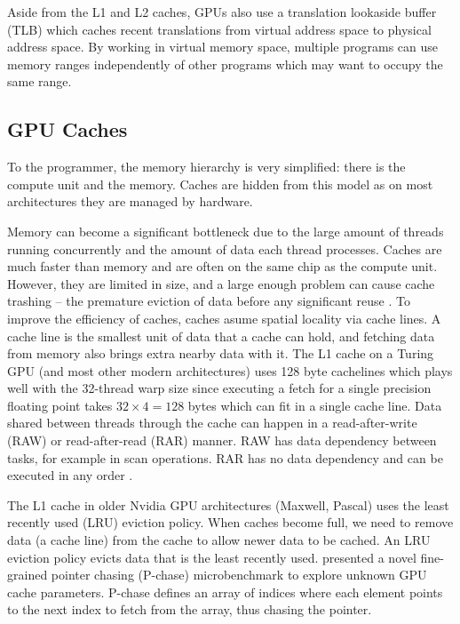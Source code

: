 Aside from the L1 and L2 caches, GPUs also use a translation lookaside buffer (TLB) which caches recent translations from virtual address space to physical address space.
By working in virtual memory space, multiple programs can use memory ranges independently of other programs which may want to occupy the same range.

\subsection{GPU Caches}
\label{sec:cache_gpu}
To the programmer, the memory hierarchy is very simplified: there is the compute unit and the memory.
Caches are hidden from this model as on most architectures they are managed by hardware.

Memory can become a significant bottleneck due to the large amount of threads running concurrently and the amount of data each thread processes.
Caches are much faster than memory and are often on the same chip as the compute unit.
However, they are limited in size, and a large enough problem can cause cache trashing -- the premature eviction of data before any significant reuse \cite{dai2016model}.
To improve the efficiency of caches, caches asume spatial locality via cache lines.
A cache line is the smallest unit of data that a cache can hold, and fetching data from memory also brings extra nearby data with it.
The L1 cache on a Turing GPU (and most other modern architectures) uses 128 byte cachelines which plays well with the 32-thread warp size since executing a fetch for a single precision floating point takes $32 \times 4 = 128$ bytes which can fit in a single cache line.
Data shared between threads through the cache can happen in a read-after-write (RAW) or read-after-read (RAR) manner.
RAW has data dependency between tasks, for example in scan operations.
RAR has no data dependency and can be executed in any order \cite{tripathy2021paver}.

The L1 cache in older Nvidia GPU architectures (Maxwell, Pascal) uses the least recently used (LRU) eviction policy.
When caches become full, we need to remove data (a cache line) from the cache to allow newer data to be cached.
An LRU eviction policy evicts data that is the least recently used.
\citet{mei2016dissecting} presented a novel fine-grained pointer chasing (P-chase) microbenchmark to explore unknown GPU cache parameters.
P-chase defines an array of indices where each element points to the next index to fetch from the array, thus chasing the pointer.

